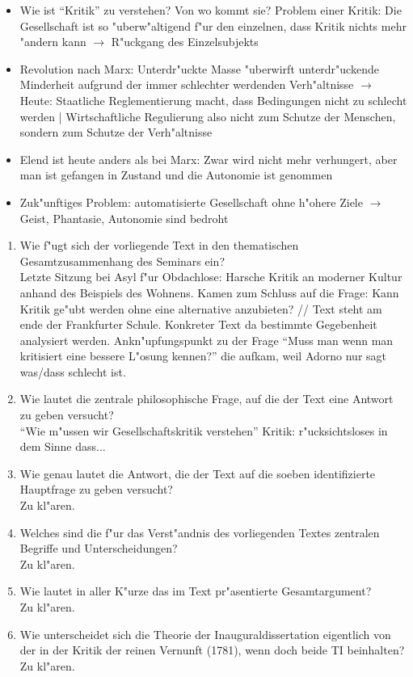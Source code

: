\documentclass[emulatestandardclasses]{scrartcl}
\begin{document}
\begin{itemize}
  \item Wie ist "`Kritik"' zu verstehen? Von wo kommt sie? Problem einer Kritik: Die Gesellschaft ist so "uberw"altigend f"ur den einzelnen, dass Kritik nichts mehr "andern kann $\rightarrow$ R"uckgang des Einzelsubjekts
  \item Revolution nach Marx: Unterdr"uckte Masse "uberwirft unterdr"uckende Minderheit aufgrund der immer schlechter werdenden Verh"altnisse $\rightarrow$ Heute: Staatliche Reglementierung macht, dass Bedingungen nicht zu schlecht werden | Wirtschaftliche Regulierung also nicht zum Schutze der Menschen, sondern zum Schutze der Verh"altnisse
   \item Elend ist heute anders als bei Marx: Zwar wird nicht mehr verhungert, aber man ist gefangen in Zustand und die Autonomie ist genommen
  \item Zuk"unftiges Problem: automatisierte Gesellschaft ohne h"ohere Ziele $\rightarrow$ Geist, Phantasie, Autonomie sind bedroht

\end{itemize}


\begin{enumerate}
  \item {\color{NavyBlue}Wie f"ugt sich der vorliegende Text in den thematischen Gesamtzusammenhang des Seminars ein?}\\
{\color{ForestGreen} Letzte Sitzung bei Asyl f"ur Obdachlose: Harsche Kritik an moderner Kultur anhand des Beispiels des Wohnens. Kamen zum Schluss auf die Frage: Kann Kritik ge"ubt werden ohne eine alternative anzubieten? // Text steht am ende der Frankfurter Schule. Konkreter Text da bestimmte Gegebenheit analysiert werden. Ankn"upfungspunkt zu der Frage "`Muss man wenn man kritisiert eine bessere L"osung kennen?"' die aufkam, weil Adorno nur sagt was/dass schlecht ist.}
  \item {\color{NavyBlue}Wie lautet die zentrale philosophische Frage, auf die der Text eine Antwort zu geben versucht?}\\
{\color{ForestGreen} "`Wie m"ussen wir Gesellschaftskritik verstehen"' Kritik: r"ucksichtsloses in dem Sinne dass...}
    \item {\color{NavyBlue} Wie genau lautet die Antwort, die der Text auf die soeben identifizierte Hauptfrage zu geben versucht?}\\
{\color{ForestGreen} Zu kl"aren.}
    \item {\color{NavyBlue} Welches sind die f"ur das Verst"andnis des vorliegenden Textes zentralen Begriffe und Unterscheidungen?}\\
{\color{ForestGreen} Zu kl"aren.}
    \item {\color{NavyBlue} Wie lautet in aller K"urze das im Text pr"asentierte Gesamtargument?}\\
{\color{ForestGreen} Zu kl"aren.}
    \item {\color{NavyBlue} Wie unterscheidet sich die Theorie der Inauguraldissertation
eigentlich von der in der Kritik der reinen Vernunft (1781), wenn doch beide TI beinhalten?}\\
{\color{ForestGreen} Zu kl"aren.}
\end{enumerate}
\end{document}
